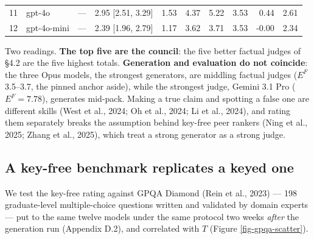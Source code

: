 \documentclass{article}
\begin{document}
\begin{table}[htb]
\begin{center}
{\begin{tabular}{@{}llcrrrrrrr@{}}
11 & gpt-4o & --- &\cellcolor[HTML]{ADDFB7}\textcolor[HTML]{1A1A1A}{2.95 {[}2.51, 3.29{]}}&\cellcolor[HTML]{E4F5B2}\textcolor[HTML]{1A1A1A}{1.53}&\cellcolor[HTML]{60C2BF}\textcolor[HTML]{1A1A1A}{4.37}&\cellcolor[HTML]{3BAFC3}\textcolor[HTML]{1A1A1A}{5.22}&\cellcolor[HTML]{8CD2BA}\textcolor[HTML]{1A1A1A}{3.53}&\cellcolor[HTML]{F9FDCB}\textcolor[HTML]{1A1A1A}{0.44}&\cellcolor[HTML]{C1E7B5}\textcolor[HTML]{1A1A1A}{2.61} \\
12 & gpt-4o-mini & --- &\cellcolor[HTML]{CAEAB4}\textcolor[HTML]{1A1A1A}{2.39 {[}1.96, 2.79{]}}&\cellcolor[HTML]{EEF8B4}\textcolor[HTML]{1A1A1A}{1.17}&\cellcolor[HTML]{86D0BA}\textcolor[HTML]{1A1A1A}{3.62}&\cellcolor[HTML]{81CEBB}\textcolor[HTML]{1A1A1A}{3.71}&\cellcolor[HTML]{8CD2BA}\textcolor[HTML]{1A1A1A}{3.53}&\cellcolor[HTML]{FFFFD9}\textcolor[HTML]{1A1A1A}{-0.00}&\cellcolor[HTML]{CCEBB4}\textcolor[HTML]{1A1A1A}{2.34} \\
\bottomrule
\end{tabular}}
\end{center}
\end{table}

Two readings. \textbf{The top five are the council}: the five better factual judges of \S{}4.2 are the five highest totals. \textbf{Generation and evaluation do not coincide}: the three Opus models, the strongest generators, are middling factual judges (\(E^{F}\) 3.5--3.7, the pinned anchor aside), while the strongest judge, Gemini 3.1 Pro (\(E^{F} = 7.78\)), generates mid-pack. Making a true claim and spotting a false one are different skills (West et al., 2024; Oh et al., 2024; Li et al., 2024), and rating them separately breaks the assumption behind key-free peer rankers (Ning et al., 2025; Zhang et al., 2025), which treat a strong generator as a strong judge.

\subsection{A key-free benchmark replicates a keyed one}\label{a-key-free-benchmark-replicates-a-keyed-one}

We test the key-free rating against GPQA Diamond (Rein et al., 2023) --- 198 graduate-level multiple-choice questions written and validated by domain experts --- put to the same twelve models under the same protocol two weeks \emph{after} the generation run (Appendix D.2), and correlated with \(T\) (Figure \ref{fig-gpqa-scatter}).
\end{document}
